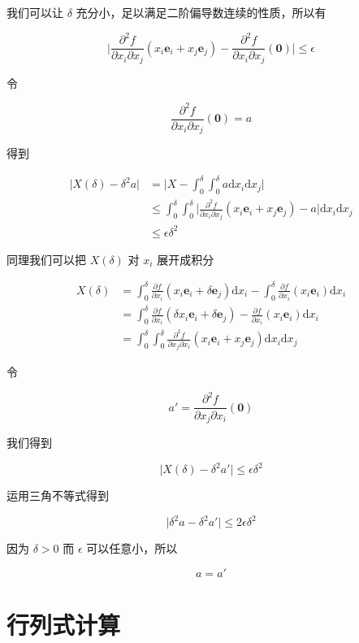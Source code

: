 \documentclass[12pt,a4paper]{ctexart}
\begin{document}
我们可以让 $\delta$ 充分小，足以满足二阶偏导数连续的性质，所以有

\[
\lvert \frac{\partial^2 f}{\partial x_i \partial x_j}(x_i \mathbf{e}_i + x_j \mathbf{e}_j) - \frac{\partial^2 f}{\partial x_i \partial x_j}(\mathbf{0}) \rvert \le \epsilon
\]

令

\[
\frac{\partial^2 f}{\partial x_i \partial x_j}(\mathbf{0}) = a
\]

得到

\begin{align*}
\lvert X(\delta) - \delta^2 a \rvert &= \lvert X - \int_{0}^{\delta}\int_{0}^{\delta}a \text{d}x_i \text{d}x_j \rvert \\
& \le  \int_{0}^{\delta}\int_{0}^{\delta} \lvert \frac{\partial^2 f}{\partial x_i \partial x_j}(x_i \mathbf{e}_i + x_j \mathbf{e}_j) - a\rvert \text{d}x_i \text{d}x_j \\
& \le \epsilon \delta^2
\end{align*}

同理我们可以把 $X(\delta)$ 对 $x_i$ 展开成积分


\begin{align*}
X(\delta)  &= \int_{0}^{\delta}\frac{\partial f}{\partial x_i}(x_i \mathbf{e}_i + \delta \mathbf{e}_j) \text{d}x_i - \int_{0}^{\delta}\frac{\partial f}{\partial x_i}(x_i \mathbf{e}_i) \text{d}x_i \\
& = \int_{0}^{\delta}\frac{\partial f}{\partial x_i}(\delta x_i\mathbf{e}_i + \delta \mathbf{e}_j) - \frac{\partial f}{\partial x_i}(x_i \mathbf{e}_i) \text{d}x_i \\
&= \int_{0}^{\delta}\int_{0}^{\delta} \frac{\partial^2 f}{\partial x_j \partial x_i}(x_i \mathbf{e}_i + x_j \mathbf{e}_j) \text{d}x_i \text{d}x_j
\end{align*}

令

\[
a' = \frac{\partial^2 f}{\partial x_j \partial x_i}(\mathbf{0})
\]

我们得到

\[
\lvert X(\delta) - \delta^2 a' \rvert \le \epsilon \delta^2
\]

运用三角不等式得到

\[
\lvert \delta^2 a - \delta^2 a' \rvert \le2\epsilon \delta^2
\]

因为 $\delta > 0$ 而 $\epsilon$ 可以任意小，所以

\[
a= a'
\]

\section{行列式计算}
\end{document}
